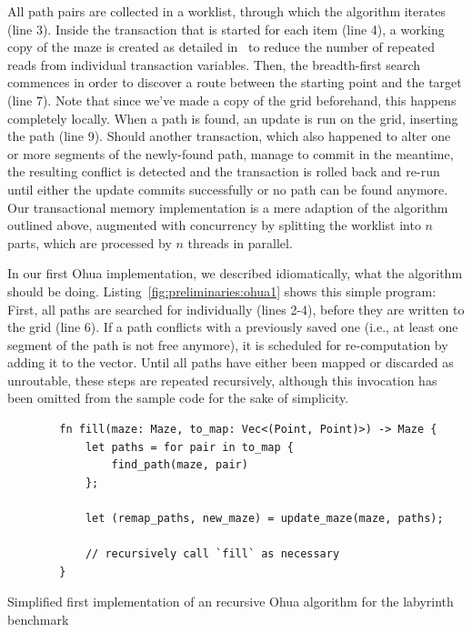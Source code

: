 All path pairs are collected in a worklist, through which the algorithm iterates (line 3).
Inside the transaction that is started for each item (line 4), a working copy of the maze is created as detailed in~\cite{swalens2016transactional} to reduce the number of repeated reads from individual transaction variables.
Then, the breadth-first search commences in order to discover a route between the starting point and the target (line 7).
Note that since we've made a copy of the grid beforehand, this happens completely locally.
When a path is found, an update is run on the grid, inserting the path (line 9).
Should another transaction, which also happened to alter one or more segments of the newly-found path, manage to commit in the meantime, the resulting conflict is detected and the transaction is rolled back and re-run until either the update commits successfully or no path can be found anymore.
Our transactional memory implementation is a mere adaption of the algorithm outlined above, augmented with concurrency by splitting the worklist into $n$ parts, which are processed by $n$ threads in parallel.

In our first Ohua implementation, we described idiomatically, what the algorithm should be doing.
Listing~\ref{fig:preliminaries:ohua1} shows this simple program: First, all paths are searched for individually (lines 2-4), before they are written to the grid (line 6).
If a path conflicts with a previously saved one (i.e., at least one segment of the path is not free anymore), it is scheduled for re-computation by adding it to the  vector.
Until all paths have either been mapped or discarded as unroutable, these steps are repeated recursively, although this invocation has been omitted from the sample code for the sake of simplicity.

\begin{listing}[t]
    \begin{verbatim}
        fn fill(maze: Maze, to_map: Vec<(Point, Point)>) -> Maze {
            let paths = for pair in to_map {
                find_path(maze, pair)
            };

            let (remap_paths, new_maze) = update_maze(maze, paths);

            // recursively call `fill` as necessary
        }
    \end{verbatim}
    \caption{Simplified first implementation of an recursive Ohua algorithm for the labyrinth benchmark}%
    \label{fig:preliminaries:ohua1}
\end{listing}

